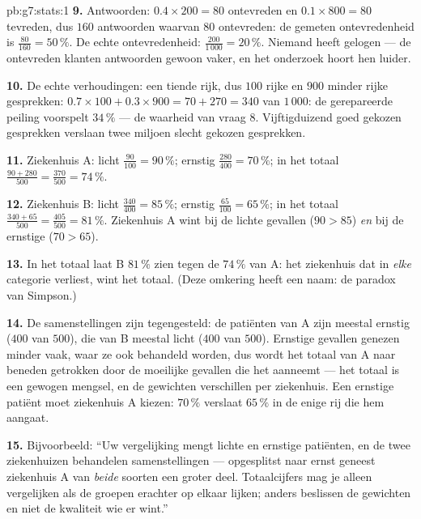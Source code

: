 \begin{solution}{pb:g7:stats:1}
\textbf{9.} Antwoorden: $0.4 \times 200 = 80$ ontevreden en $0.1 \times 800 = 80$
tevreden, dus $160$ antwoorden waarvan $80$ ontevreden: de gemeten ontevredenheid
is $\frac{80}{160} = 50\,\%$. De echte ontevredenheid:
$\frac{200}{1\,000} = 20\,\%$. Niemand heeft gelogen --- de ontevreden klanten
antwoorden gewoon vaker, en het onderzoek hoort hen luider.

\textbf{10.} De echte verhoudingen: een tiende rijk, dus $100$ rijke en $900$
minder rijke gesprekken: $0.7 \times 100 + 0.3 \times 900 = 70 + 270 = 340$ van
$1\,000$: de gerepareerde peiling voorspelt $34\,\%$ --- de waarheid van vraag 8.
Vijftigduizend goed gekozen gesprekken verslaan twee miljoen slecht gekozen
gesprekken.

\textbf{11.} Ziekenhuis A: licht $\frac{90}{100} = 90\,\%$; ernstig
$\frac{280}{400} = 70\,\%$; in het totaal
$\frac{90 + 280}{500} = \frac{370}{500} = 74\,\%$.

\textbf{12.} Ziekenhuis B: licht $\frac{340}{400} = 85\,\%$; ernstig
$\frac{65}{100} = 65\,\%$; in het totaal
$\frac{340 + 65}{500} = \frac{405}{500} = 81\,\%$. Ziekenhuis A wint bij de lichte
gevallen ($90 > 85$) \emph{en} bij de ernstige ($70 > 65$).

\textbf{13.} In het totaal laat B $81\,\%$ zien tegen de $74\,\%$ van A: het
ziekenhuis dat in \emph{elke} categorie verliest, wint het totaal. (Deze omkering
heeft een naam: de paradox van Simpson.)

\textbf{14.} De samenstellingen zijn tegengesteld: de patiënten van A zijn meestal
ernstig ($400$ van $500$), die van B meestal licht ($400$ van $500$). Ernstige
gevallen genezen minder vaak, waar ze ook behandeld worden, dus wordt het totaal van
A naar beneden getrokken door de moeilijke gevallen die het aanneemt --- het totaal
is een gewogen mengsel, en de gewichten verschillen per ziekenhuis. Een ernstige
patiënt moet ziekenhuis A kiezen: $70\,\%$ verslaat $65\,\%$ in de enige rij die
hem aangaat.

\textbf{15.} Bijvoorbeeld: ``Uw vergelijking mengt lichte en ernstige patiënten, en
de twee ziekenhuizen behandelen  samenstellingen --- opgesplitst naar
ernst geneest ziekenhuis A van \emph{beide} soorten een groter deel. Totaalcijfers
mag je alleen vergelijken als de groepen erachter op elkaar lijken; anders beslissen
de gewichten en niet de kwaliteit wie er wint.''
\end{solution}
